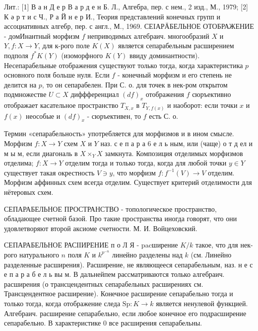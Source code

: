 \documentclass[10pt]{article}
\begin{document}
Лит.: [1] В а н Д е р В а р д е н Б. Л., Алгебра, пер. с нем., 2 изд., М., 1979; [2] К ә р т и с Ч., Р а Й н е р И., Теория представлений конечных групп и ассоциативных алгебр, пер. с англ., М., 1969. СЕIАРӒБЕЛЬНОЕ ОТОБРАЖЕНИЕ - домИнантный морфизм $f$ неприводимых алгебраич. многообразий $X$ и $Y, f: X \rightarrow Y$, для к-рого поле $K(X)$ является сепарабельным расширением подполя $f^{*} K(Y)$ (изоморфного $K(Y)$ ввиду доминантности). Несепарабельные отображения существуют только тогда, когда характеристика $p$ основного поля больше нуля. Если $f$ - конечный морфизм и его степень не делится на $p$, то он сепарабелен. При С. о. для точек в нек-ром открытом подмножестве $U \subset X$ диффференциал $(d f)_{x}$ отображения $f$ сюръективно отображает касательное пространство $T_{X, x}$ в $T_{Y, f(x)}$ и наоборот: если точки $x$ и $f(x)$ неособые и $(d f)_{x}$ - сюръективен, то $f$ есть С. о.



Термин «сепарабельность» употребляется для морфизмов и в ином смысле. Морфизм $f: X \rightarrow Y$ схем $X$ и $Y$ наз. с е п а р а 6 е л ь ным, или (чаще) о т д ел и м ы м, если диагональ в $X \times_{Y} X$ замкнута. Композиция отделимых морфизмов отделима; $f: X \rightarrow Y$ отделим тогда и только тогда, когда для любой точки $y \in Y$ существует такая окрестность $V \ni y$, что морфизм $f: f^{-1}(V) \rightarrow V$ отделим. Морфизм аффинных схем всегда отделим. Существует критерий отделимости для нётеровых схем.



СЕПАРАБЕЛЬНОЕ ПРОСТРАНСТВО - топологическое пространство, обладающее счетной базой. Про такие пространства иногда говорят, что они удовлетворяют второй аксиоме счетности. М. И. Войцеховский.



СЕПАРАБЕЛЬНОЕ РАСІІИРЕНИЕ п $о$ Л Я - pacширение $K / k$ такое, что для нек-рого натурального $n$ поля $K$ и $k^{p^{-n}}$ линейно разделены над $k$ (см. Линейно разделенные расширения). Расширение, не являющееся сепарабельным, наз. н е с е п а р а б е л ь вы м. В дальнейпем рассматриваются только алгебраич. расширения (о трансцендентных сепарабельных расширениях см. Трансцендентное расширение). Конечное расширение сепарабельно тогда и только тогда, когда отображение следа $\mathrm{Sp}: K \rightarrow k$ является ненулевой функцией. Алгебраич. расширение сепарабельно, если любое конечное его подрасширение сепарабельно. В характеристике 0 все расширения сепарабельны.
\end{document}
